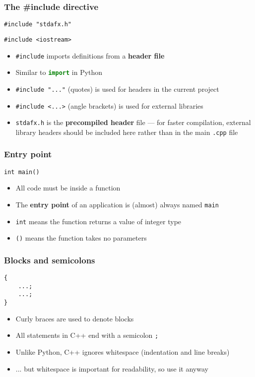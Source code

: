 \begin{frame}[fragile]
	\frametitle{The \#include directive}
	\begin{lstlisting}
#include "stdafx.h"
	\end{lstlisting}
	\begin{lstlisting}
#include <iostream>
	\end{lstlisting}
	\begin{itemize}
		\item \lstinline{#include} imports definitions from a \textbf{header file}
		\item Similar to \lstinline[language=Python]{import} in Python
		\item \lstinline{#include "..."} (quotes) is used for headers in the current project
		\item \lstinline{#include <...>} (angle brackets) is used for external libraries
		\item \texttt{stdafx.h} is the \textbf{precompiled header} file --- for faster compilation, external library headers should be included here rather than in the main \texttt{.cpp} file
	\end{itemize}
\end{frame}

\begin{frame}[fragile]
	\frametitle{Entry point}
	\begin{lstlisting}
int main()
	\end{lstlisting}
	\begin{itemize}
		\item All code must be inside a function
		\item The \textbf{entry point} of an application is (almost) always named \lstinline{main}
		\item \lstinline{int} means the function returns a value of integer type
		\item \lstinline{()} means the function takes no parameters
	\end{itemize}
\end{frame}

\begin{frame}[fragile]
	\frametitle{Blocks and semicolons}
	\begin{lstlisting}
{
    ...;
    ...;
}
	\end{lstlisting}
	\begin{itemize}
		\item Curly braces are used to denote blocks
		\item All statements in C++ end with a semicolon \lstinline{;}
		\item Unlike Python, C++ ignores whitespace (indentation and line breaks)
		\item ... but whitespace is important for readability, so use it anyway
	\end{itemize}
\end{frame}

